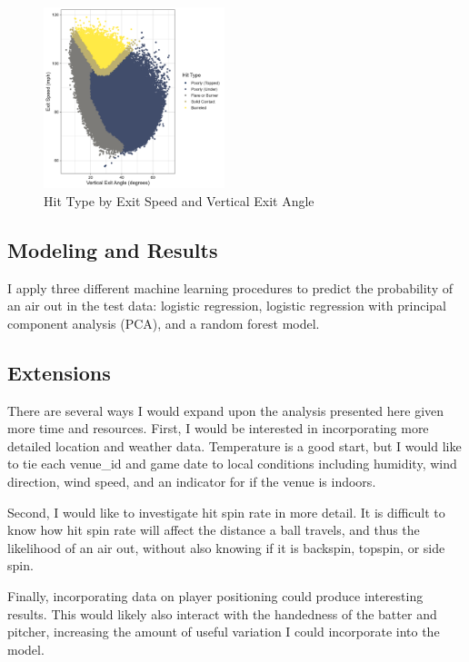 \begin{figure}[htb]
  \includegraphics[width = 0.47\textwidth]{../../output/figs/barreled.png}
  \caption{Hit Type by Exit Speed and Vertical Exit Angle}
  \label{fig:barreled}
\end{figure}

\subsection{Modeling and Results}
\label{subsec:model}

I apply three different machine learning procedures to predict the probability of an air out in the test data: logistic regression, logistic regression with principal component analysis (PCA), and a random forest model.

\subsection{Extensions}
\label{subsec:results}

There are several ways I would expand upon the analysis presented here given more time and resources. First, I would be interested in incorporating more detailed location and weather data. Temperature is a good start, but I would like to tie each venue\_id and game date to local conditions including humidity, wind direction, wind speed, and an indicator for if the venue is indoors.

Second, I would like to investigate hit spin rate in more detail. It is difficult to know how hit spin rate will affect the distance a ball travels, and thus the likelihood of an air out, without also knowing if it is backspin, topspin, or side spin.

Finally, incorporating data on player positioning could produce interesting results. This would likely also interact with the handedness of the batter and pitcher, increasing the amount of useful variation I could incorporate into the model.
